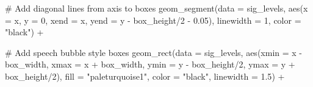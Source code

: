 \documentclass[
  letterpaper,
  DIV=11,
  numbers=noendperiod]{scrreprt}
\newenvironment{Shaded}{\begin{snugshade}}{\end{snugshade}}
\newcommand{\AttributeTok}[1]{\textcolor[rgb]{0.40,0.45,0.13}{#1}}
\newcommand{\CommentTok}[1]{\textcolor[rgb]{0.37,0.37,0.37}{#1}}
\newcommand{\DecValTok}[1]{\textcolor[rgb]{0.68,0.00,0.00}{#1}}
\newcommand{\FloatTok}[1]{\textcolor[rgb]{0.68,0.00,0.00}{#1}}
\newcommand{\FunctionTok}[1]{\textcolor[rgb]{0.28,0.35,0.67}{#1}}
\newcommand{\NormalTok}[1]{\textcolor[rgb]{0.00,0.23,0.31}{#1}}
\newcommand{\SpecialCharTok}[1]{\textcolor[rgb]{0.37,0.37,0.37}{#1}}
\newcommand{\StringTok}[1]{\textcolor[rgb]{0.13,0.47,0.30}{#1}}
\begin{document}
\begin{Shaded}
\begin{Highlighting}[]
  \CommentTok{\# Add diagonal lines from axis to boxes}
  \FunctionTok{geom\_segment}\NormalTok{(}\AttributeTok{data =}\NormalTok{ sig\_levels,}
               \FunctionTok{aes}\NormalTok{(}\AttributeTok{x =}\NormalTok{ x, }\AttributeTok{y =} \DecValTok{0}\NormalTok{, }\AttributeTok{xend =}\NormalTok{ x, }\AttributeTok{yend =}\NormalTok{ y }\SpecialCharTok{{-}}\NormalTok{ box\_height}\SpecialCharTok{/}\DecValTok{2} \SpecialCharTok{{-}} \FloatTok{0.05}\NormalTok{),}
               \AttributeTok{linewidth =} \DecValTok{1}\NormalTok{, }\AttributeTok{color =} \StringTok{"black"}\NormalTok{) }\SpecialCharTok{+}
  
  \CommentTok{\# Add speech bubble style boxes}
  \FunctionTok{geom\_rect}\NormalTok{(}\AttributeTok{data =}\NormalTok{ sig\_levels,}
            \FunctionTok{aes}\NormalTok{(}\AttributeTok{xmin =}\NormalTok{ x }\SpecialCharTok{{-}}\NormalTok{ box\_width, }\AttributeTok{xmax =}\NormalTok{ x }\SpecialCharTok{+}\NormalTok{ box\_width,}
                \AttributeTok{ymin =}\NormalTok{ y }\SpecialCharTok{{-}}\NormalTok{ box\_height}\SpecialCharTok{/}\DecValTok{2}\NormalTok{, }\AttributeTok{ymax =}\NormalTok{ y }\SpecialCharTok{+}\NormalTok{ box\_height}\SpecialCharTok{/}\DecValTok{2}\NormalTok{),}
            \AttributeTok{fill =} \StringTok{"paleturquoise1"}\NormalTok{, }\AttributeTok{color =} \StringTok{"black"}\NormalTok{, }\AttributeTok{linewidth =} \FloatTok{1.5}\NormalTok{) }\SpecialCharTok{+}
  

\end{Highlighting}
\end{Shaded}
\end{document}
